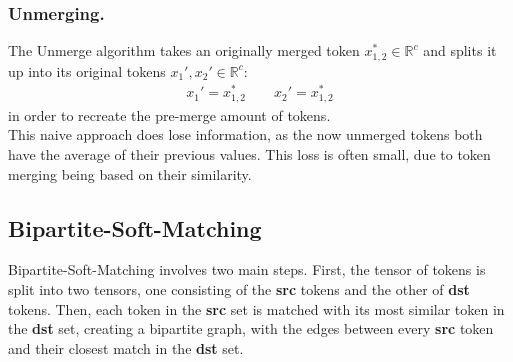 \subsubsection*{Unmerging.} The Unmerge algorithm takes an originally merged token $x_{1,2}^* \in \mathbb{R}^c$ and splits it up into its original tokens $x_1', x_2' \in \mathbb{R}^c$: 
\begin{align*}
    x_1' = x_{1,2}^* \quad\quad
    x_2' = x_{1,2}^*
\end{align*}
in order to recreate the pre-merge amount of tokens.\\
This naive approach does lose information, as the now unmerged tokens both have the average of their previous values. This loss is often small, due to token merging being based on their similarity.



\subsection{Bipartite-Soft-Matching}
Bipartite-Soft-Matching involves two main steps. First, the tensor of tokens is split into two tensors, one consisting of the \textbf{src} tokens and the other of \textbf{dst} tokens. Then, each token in the \textbf{src} set is matched with its most similar token in the \textbf{dst} set, creating a bipartite graph, with the edges between every \textbf{src} token and their closest match in the \textbf{dst} set. 



